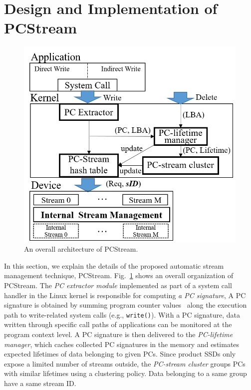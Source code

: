 \section{Design and Implementation of \textsf{PCStream}}

\begin{figure}[t]
	\centering
	\includegraphics[width=0.6\linewidth]{figure/overview}
	\caption{An overall architecture of \textsf{\small PCStream}.}
	\label{fig:architecture}
\end{figure}

In this section, we explain the details of the proposed automatic stream
management technique, \textsf{\small PCStream}.
Fig.~\ref{fig:architecture} shows an overall organization of \textsf{\small
PCStream}. The \textit{PC extractor module} implemented as part of a system
call handler in the Linux kernel is responsible for computing \textit{a PC
signature},  A PC
signature is obtained by summing program counter values~\cite{PC} along the
execution path to write-related system calls (e.g., {\tt write()}).  With a PC
signature, data written through specific call paths of applications can be
monitored at the program context level.  A PC signature is then delivered to
the \textit{PC-lifetime manager}, which caches collected PC signatures in the
memory and estimates expected lifetimes of data belonging to given PCs.  Since
product SSDs only expose a limited number of streams outside, the
\textit{PC-stream cluster} groups PCs with similar lifetimes using a clustering 
policy. Data belonging to a same group have a same stream ID.


